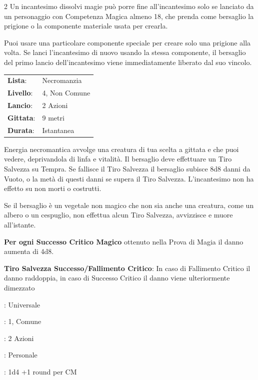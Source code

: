 \begin{multicols}{2}
Un incantesimo dissolvi magie può porre fine all'incantesimo solo se lanciato da un personaggio con Competenza Magica almeno 18, che prenda come bersaglio la prigione o la componente materiale usata per crearla.

Puoi usare una particolare componente speciale per creare solo una prigione alla volta. Se lanci l'incantesimo di nuovo usando la stessa componente, il bersaglio del primo lancio dell'incantesimo viene immediatamente liberato dal suo vincolo.

\noindent\begin{tabularx}{\linewidth}{p{1.9cm}X}
	\rowcolor{gray!20}\textbf{Lista}: & Necromanzia \\
	\textbf{Livello}: & 4, Non Comune \\
	\rowcolor{gray!20}\textbf{Lancio}: & 2 Azioni \\
	\textbf{Gittata}: & 9 metri \\
	\rowcolor{gray!20}\textbf{Durata}: & Istantanea \\
\end{tabularx}\smallskip

Energia necromantica avvolge una creatura di tua scelta a gittata e che puoi vedere, deprivandola di linfa e vitalità. Il bersaglio deve effettuare un Tiro Salvezza su Tempra. Se fallisce il Tiro Salvezza il bersaglio subisce 8d8 danni da Vuoto, o la metà di questi danni se supera il Tiro Salvezza. L'incantesimo non ha effetto su non morti o costrutti.

Se il bersaglio è un vegetale non magico che non sia anche una creatura, come un albero o un cespuglio, non effettua alcun Tiro Salvezza, avvizzisce e muore all'istante.

\textbf{Per ogni Successo Critico Magico} ottenuto nella Prova di Magia il danno aumenta di 4d8.

\textbf{Tiro Salvezza Successo/Fallimento Critico}: In caso di Fallimento Critico il danno raddoppia, in caso di Successo Critico il danno viene ulteriormente dimezzato

\begin{description}[noitemsep, topsep=0pt, parsep=0pt, partopsep=0pt, leftmargin=0cm, labelwidth=1.3cm]
	\item[\textbf{Lista}]: Universale
	\item[\textbf{Livello}]: 1, Comune
	\item[\textbf{Lancio}]: 2 Azioni
	\item[\textbf{Gittata}]: Personale
	\item[\textbf{Durata}]: 1d4 +1 round per CM
\end{description}


\end{multicols}
